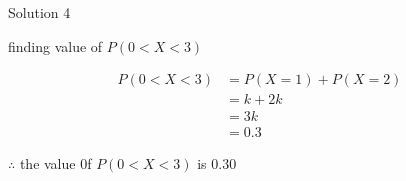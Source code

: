 \documentclass{beamer}
\begin{document}
\begin{frame}{Solution 4}
       \begin{block}{finding value of $P(0 < X < 3)$}
       
                \begin{align}
                    P(0 < X < 3 )  &= P(X = 1 ) + P(X = 2 ) \\
                                   &= k + 2k \\
                                   &= 3k \\
                                   &= 0.3
                \end{align}
                
                $\therefore$ the value 0f $P(0 < X < 3)$ is $0.30$
       \end{block}

\end{frame}


         
\end{document}
